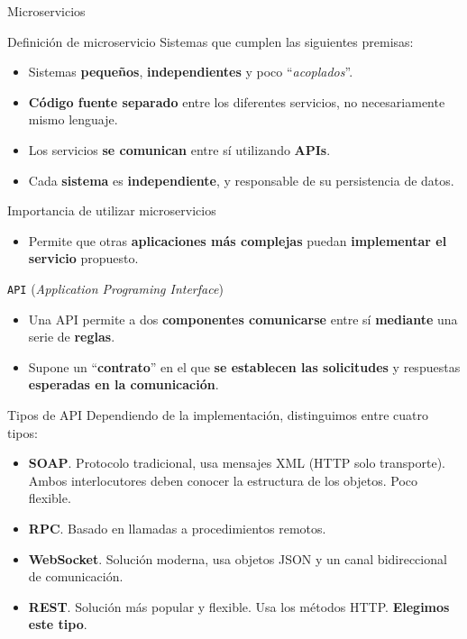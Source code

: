 \documentclass[aspectratio=169,xcolor=dvipsnames]{beamer}
\begin{document}
	\begin{frame}{Microservicios}
		\begin{exampleblock}{Definición de microservicio}
			Sistemas que cumplen las siguientes premisas: 
			
			\begin{itemize}
				\item Sistemas \textbf{pequeños}, \textbf{independientes} y poco ``\textit{acoplados}''. 
				\item \textbf{Código fuente separado} entre los diferentes servicios, no necesariamente mismo lenguaje.
				\item Los servicios \textbf{se comunican} entre sí utilizando \textbf{APIs}.
				\item Cada \textbf{sistema} es \textbf{independiente}, y responsable de su persistencia de datos.
			\end{itemize}
		\end{exampleblock}
		
		\begin{alertblock}{Importancia de utilizar microservicios}
			\begin{itemize}
				\item Permite que otras \textbf{aplicaciones más complejas} puedan \textbf{implementar el servicio} propuesto.
			\end{itemize}
		\end{alertblock}
	\end{frame}

	
	\begin{frame}{\texttt{API} \small (\textit{Application Programing Interface})}
		\begin{itemize}
			\item Una API permite a dos \textbf{componentes comunicarse} entre sí \textbf{mediante} una serie de \textbf{reglas}.
			
			\item Supone un ``\textbf{contrato}'' en el que \textbf{se establecen las solicitudes} y respuestas \textbf{esperadas en la comunicación}.
		\end{itemize}
	
		\begin{exampleblock}{Tipos de API}
			Dependiendo de la implementación, distinguimos entre cuatro tipos:
			
			\begin{itemize}
				\item \textbf{SOAP}. Protocolo tradicional, usa mensajes XML (HTTP solo transporte). Ambos interlocutores deben conocer la estructura de los objetos. Poco flexible.
				\item \textbf{RPC}. Basado en llamadas a procedimientos remotos. 
				\item \textbf{WebSocket}. Solución moderna, usa objetos JSON y un canal bidireccional de comunicación.
				\item \textbf{REST}. Solución más popular y flexible. Usa los métodos HTTP. \textbf{Elegimos este tipo}.
			\end{itemize}
		\end{exampleblock}
	\end{frame}
	
\end{document}

